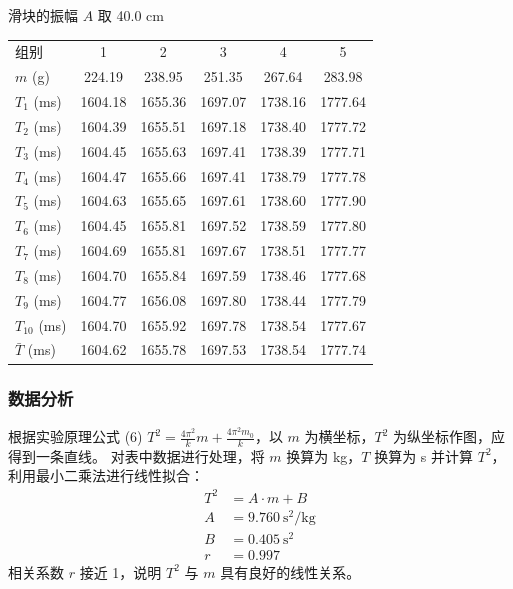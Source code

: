 \documentclass[11pt]{article}
\begin{document}
滑块的振幅 $A$ 取 40.0 cm

\begin{table}[h]
    \centering
    \small %
    \begin{tabular}{lccccc}
        \toprule
        组别 & 1 & 2 & 3 & 4 & 5 \\
        $m$ (g) & 224.19 & 238.95 & 251.35 & 267.64 & 283.98 \\
        \midrule
        $T_1$ (ms) & 1604.18 & 1655.36 & 1697.07 & 1738.16 & 1777.64 \\
        $T_2$ (ms) & 1604.39 & 1655.51 & 1697.18 & 1738.40 & 1777.72 \\
        $T_3$ (ms) & 1604.45 & 1655.63 & 1697.41 & 1738.39 & 1777.71 \\
        $T_4$ (ms) & 1604.47 & 1655.66 & 1697.41 & 1738.79 & 1777.78 \\
        $T_5$ (ms) & 1604.63 & 1655.65 & 1697.61 & 1738.60 & 1777.90 \\
        $T_6$ (ms) & 1604.45 & 1655.81 & 1697.52 & 1738.59 & 1777.80 \\
        $T_7$ (ms) & 1604.69 & 1655.81 & 1697.67 & 1738.51 & 1777.77 \\
        $T_8$ (ms) & 1604.70 & 1655.84 & 1697.59 & 1738.46 & 1777.68 \\
        $T_9$ (ms) & 1604.77 & 1656.08 & 1697.80 & 1738.44 & 1777.79 \\
        $T_{10}$ (ms) & 1604.70 & 1655.92 & 1697.78 & 1738.54 & 1777.67 \\
        \midrule
        $\bar{T}$ (ms) & 1604.62 & 1655.78 & 1697.53 & 1738.54 & 1777.74 \\
        \bottomrule
    \end{tabular}
\end{table}

\subsubsection{数据分析}
根据实验原理公式 (6) $T^2 = \frac{4\pi^2}{k}m + \frac{4\pi^2 m_0}{k}$，以 $m$ 为横坐标，$T^2$ 为纵坐标作图，应得到一条直线。
对表中数据进行处理，将 $m$ 换算为 kg，$T$ 换算为 s 并计算 $T^2$，利用最小二乘法进行线性拟合：
\begin{align*}
T^2 &= A \cdot m + B \\
A &= 9.760\ \mathrm{s^2/kg} \\
B &= 0.405\ \mathrm{s^2} \\
r &= 0.997
\end{align*}
相关系数 $r$ 接近 1，说明 $T^2$ 与 $m$ 具有良好的线性关系。
\end{document}
